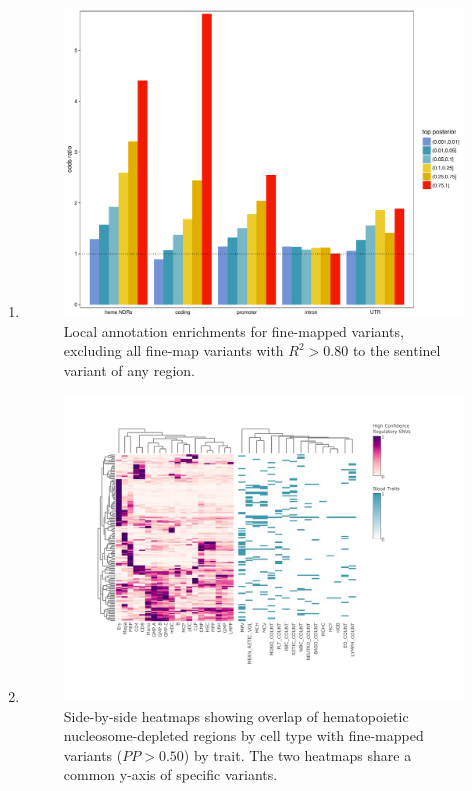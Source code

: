 \documentclass{article}\usepackage[]{graphicx}\usepackage[]{color}
\begin{document}
\begin{enumerate}[label=(\Alph*)]
\item
\begin{figure}
\centering
\includegraphics[width=\linewidth]{staticFigures/FINEMAP_enrichments_ExcludingSentinels.pdf}
\caption{Local annotation enrichments for fine-mapped variants, excluding all fine-map variants with $R^2>0.80$ to the sentinel variant of any region.}
\end{figure} 

\item
\begin{figure}
\centering
\includegraphics[width=\linewidth]{staticFigures/UKBB_PP50_bulk.pdf}
\caption{Side-by-side heatmaps showing overlap of hematopoietic nucleosome-depleted regions by cell type with fine-mapped variants ($PP>0.50$) by trait. The two heatmaps share a common y-axis of specific variants.}
\end{figure} 


\end{enumerate}
\end{document}

